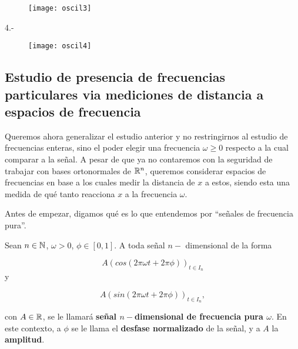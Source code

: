 \begin{figure}[H]
\texttt{[image: oscil3]}
\end{figure}

4.- 
\begin{figure}[H]
\texttt{[image: oscil4]}
\end{figure}



\subsection{Estudio de presencia de frecuencias particulares via mediciones de distancia a espacios de frecuencia}

Queremos ahora generalizar el estudio anterior y no restringirnos
al estudio de frecuencias enteras, 
sino el poder elegir una frecuencia $\omega \geq 0$ respecto
a la cual comparar a la señal. A pesar
de que ya no contaremos con la seguridad de trabajar con bases
ortonormales de $\mathbb{R}^{n}$, queremos considerar espacios de frecuencias
en base a los cuales medir la distancia de $x$ a estos, siendo
esta una medida de qué tanto reacciona $x$ a la frecuencia $\omega$.

Antes de empezar, 
digamos qué es lo que 
entendemos por ``señales de frecuencia pura''.
\begin{defi}
Sean $n \in \mathbb{N}$,  $\omega>0$, $\phi \in [0,1]$.  A toda señal $n-$
dimensional  
de la forma

\begin{equation}
A \left(
cos \left(  2 \pi \omega t + 2 \pi \phi
\right)
\right)_{t \in I_{n}}
\end{equation}
y

\begin{equation}
A \left(
sin \left(  2 \pi \omega t + 2 \pi \phi
\right)
\right)_{t \in I_{n}},
\end{equation}

\noindent
con $A \in \mathbb{R}$, se le llamará
\textbf{señal $n-$dimensional de frecuencia
pura $\omega$}. En este contexto,
a $\phi$ se le llama el \textbf{desfase normalizado}
de la señal, y a $A$ la \textbf{amplitud}.
\end{defi}


